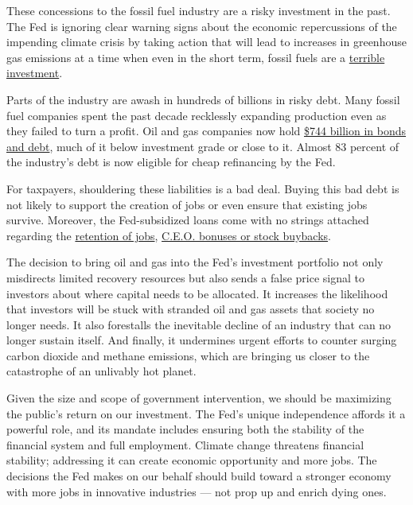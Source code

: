 These concessions to the fossil fuel industry are a risky investment in
the past. The Fed is ignoring clear warning signs about the economic
repercussions of the impending climate crisis by taking action that will
lead to increases in greenhouse gas emissions at a time when even in the
short term, fossil fuels are a
\href{https://www.eenews.net/stories/1063050681}{terrible}
\href{https://www.cnbc.com/2020/01/31/cramer-sees-oil-stocks-in-the-death-knell-phase-says-new-tobacco.html}{investment}.

Parts of the industry are awash in hundreds of billions in risky debt.
Many fossil fuel companies spent the past decade recklessly expanding
production even as they failed to turn a profit. Oil and gas companies
now hold
\href{https://ieefa.org/ieefa-commentary-federal-lending-to-the-oil-and-gas-sector-would-be-a-complete-waste-of-money/}{\$744
billion in bonds and debt}, much of it below investment grade or close
to it. Almost 83 percent of the industry's debt is now eligible for
cheap refinancing by the Fed.

For taxpayers, shouldering these liabilities is a bad deal. Buying this
bad debt is not likely to support the creation of jobs or even ensure
that existing jobs survive. Moreover, the Fed-subsidized loans come with
no strings attached regarding the
\href{https://www.bloomberg.com/news/articles/2020-05-01/fed-rebuked-over-loan-terms-that-don-t-explicitly-bar-layoffs}{retention
of jobs},
\href{https://www.washingtonpost.com/business/2020/04/28/federal-reserve-bond-corporations/}{C.E.O.
bonuses or stock buybacks}.

The decision to bring oil and gas into the Fed's investment portfolio
not only misdirects limited recovery resources but also sends a false
price signal to investors about where capital needs to be allocated. It
increases the likelihood that investors will be stuck with stranded oil
and gas assets that society no longer needs. It also forestalls the
inevitable decline of an industry that can no longer sustain itself. And
finally, it undermines urgent efforts to counter surging carbon dioxide
and methane emissions, which are bringing us closer to the catastrophe
of an unlivably hot planet.

Given the size and scope of government intervention, we should be
maximizing the public's return on our investment. The Fed's unique
independence affords it a powerful role, and its mandate includes
ensuring both the stability of the financial system and full employment.
Climate change threatens financial stability; addressing it can create
economic opportunity and more jobs. The decisions the Fed makes on our
behalf should build toward a stronger economy with more jobs in
innovative industries --- not prop up and enrich dying ones.

